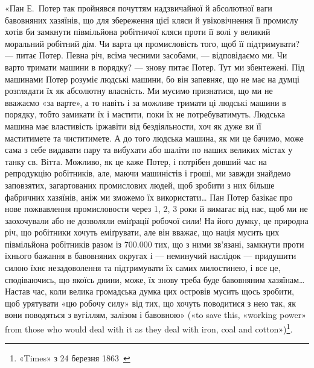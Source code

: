 «Пан Е.~Потер так пройнявся почуттям надзвичайної й абсолютної
ваги бавовняних хазяїнів, що для збереження цієї кляси
й увіковічнення її промислу хотів би замкнути півмільйона робітничої
кляси проти її волі у великий моральний робітний дім.
Чи варта ця промисловість того, щоб її підтримувати? — питає
Потер. Певна річ, всіма чесними засобами, — відповідаємо ми.
Чи варто тримати машини в порядку? — знову питає Потер.
Тут ми збентежені. Під машинами Потер розуміє людські машини,
бо він запевняє, що не має на думці розглядати їх як абсолютну
власність. Ми мусимо признатися, що ми не вважаємо «за варте»,
а то навіть і за можливе тримати ці людські машини в порядку,
тобто замикати їх і мастити, поки їх не потребуватимуть. Людська
машина має властивість іржавіти від бездіяльности, хоч
як дуже ви її маститимете та чиститимете. А до того людська
машина, як ми це бачимо, може сама з себе видавати пару та вибухати
або шаліти по наших великих містах у танку св. Вітта.
Можливо, як це каже Потер, і потрібен довший час на репродукцію
робітників, але, маючи машиністів і гроші, ми завжди
знайдемо заповзятих, загартованих промислових людей, щоб
зробити з них більше фабричних хазяїнів, аніж ми зможемо їх
використати\dots{} Пан Потер базікає про нове пожвавлення промисловости
через 1, 2, 3 роки й вимагає від нас, щоб ми не заохочували
або не дозволяли еміґрації робочої сили! На його думку,
це природна річ, що робітники хочуть еміґрувати, але він вважає,
що нація мусить цих півмільйона робітників разом із \num{700.000} тих,
що з ними зв’язані, замкнути проти їхнього бажання в бавовняних
округах і — неминучий наслідок — придушити силою їхнє
незадоволення та підтримувати їх самих милостинею, і все це,
сподіваючись, що якоїсь днини, може, їх знову треба буде бавовняним
хазяїнам\dots{} Настав час, коли велика громадська думка
цих островів мусить щось зробити, щоб урятувати «цю робочу
силу» від тих, що хочуть поводитися з нею так, як вони поводяться
з вугіллям, залізом і бавовною» («to save this, «working
power» from those who would deal with it as they deal with iron,
coal and cotton»)\footnote{
«Times» з 24 березня 1863~
}.

